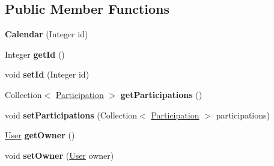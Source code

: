 \subsection*{Public Member Functions}
\begin{DoxyCompactItemize}
\item 
\hypertarget{classit_1_1polimi_1_1se_1_1calcare_1_1entities_1_1Calendar_a4b694cd9a0d7edbfacaf27d05eafce25}{}{\bfseries Calendar} (Integer id)\label{classit_1_1polimi_1_1se_1_1calcare_1_1entities_1_1Calendar_a4b694cd9a0d7edbfacaf27d05eafce25}

\item 
\hypertarget{classit_1_1polimi_1_1se_1_1calcare_1_1entities_1_1Calendar_abe4ad69a4d27afdbd007c742c5b3d322}{}Integer {\bfseries get\+Id} ()\label{classit_1_1polimi_1_1se_1_1calcare_1_1entities_1_1Calendar_abe4ad69a4d27afdbd007c742c5b3d322}

\item 
\hypertarget{classit_1_1polimi_1_1se_1_1calcare_1_1entities_1_1Calendar_af3c8ffef24b326ef527295b712b467e1}{}void {\bfseries set\+Id} (Integer id)\label{classit_1_1polimi_1_1se_1_1calcare_1_1entities_1_1Calendar_af3c8ffef24b326ef527295b712b467e1}

\item 
\hypertarget{classit_1_1polimi_1_1se_1_1calcare_1_1entities_1_1Calendar_ace37d2f5c23bd063a513d48cd5847aea}{}Collection$<$ \hyperlink{classit_1_1polimi_1_1se_1_1calcare_1_1entities_1_1Participation}{Participation} $>$ {\bfseries get\+Participations} ()\label{classit_1_1polimi_1_1se_1_1calcare_1_1entities_1_1Calendar_ace37d2f5c23bd063a513d48cd5847aea}

\item 
\hypertarget{classit_1_1polimi_1_1se_1_1calcare_1_1entities_1_1Calendar_a914f950fec30819fa9686b42b8dd80c6}{}void {\bfseries set\+Participations} (Collection$<$ \hyperlink{classit_1_1polimi_1_1se_1_1calcare_1_1entities_1_1Participation}{Participation} $>$ participations)\label{classit_1_1polimi_1_1se_1_1calcare_1_1entities_1_1Calendar_a914f950fec30819fa9686b42b8dd80c6}

\item 
\hypertarget{classit_1_1polimi_1_1se_1_1calcare_1_1entities_1_1Calendar_ac3553a3082f38c57773530d40a17da52}{}\hyperlink{classit_1_1polimi_1_1se_1_1calcare_1_1entities_1_1User}{User} {\bfseries get\+Owner} ()\label{classit_1_1polimi_1_1se_1_1calcare_1_1entities_1_1Calendar_ac3553a3082f38c57773530d40a17da52}

\item 
\hypertarget{classit_1_1polimi_1_1se_1_1calcare_1_1entities_1_1Calendar_a43182f5983ed119449e483a5630681fd}{}void {\bfseries set\+Owner} (\hyperlink{classit_1_1polimi_1_1se_1_1calcare_1_1entities_1_1User}{User} owner)\label{classit_1_1polimi_1_1se_1_1calcare_1_1entities_1_1Calendar_a43182f5983ed119449e483a5630681fd}


\end{DoxyCompactItemize}
